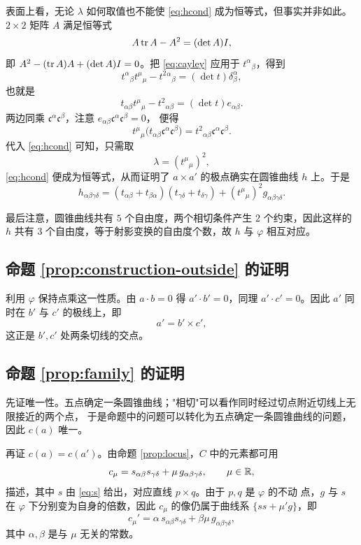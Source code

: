 表面上看，无论 $\lambda$ 如何取值也不能使 \eqref{eq:hcond} 成为恒等式，但事实并非如此。
$2\times2$ 矩阵 $A$ 满足恒等式
\begin{equation}\label{eq:cayley}
A\operatorname{tr} A-A^2=(\det A)I,
\end{equation}
即 $A^2-(\operatorname{tr} A)A+(\det A)I=0$。把 \eqref{eq:cayley} 应用于 ${t^\alpha}_\beta$，得到
\[
{t^\alpha}_\beta{t^\mu}_\mu-{{t^2}{}^\alpha}_\beta=(\det t)\delta^\alpha_\beta,
\]
也就是
\[
t_{\alpha\beta}{t^\mu}_\mu-{t^2}_{\alpha\beta}=(\det t)e_{\alpha\beta}.
\]
两边同乘 $\mathfrak c^\alpha\mathfrak c^\beta$，注意 $e_{\alpha\beta}\mathfrak c^\alpha\mathfrak c^\beta=0$，
便得
\[
{t^\mu}_\mu\bigl(t_{\alpha\beta}\mathfrak c^\alpha\mathfrak c^\beta\bigr)
={t^2}_{\alpha\beta}\mathfrak c^\alpha\mathfrak c^\beta .
\]
代入 \eqref{eq:hcond} 可知，只需取
\[
\lambda=({t^\mu}_\mu)^2,
\]
\eqref{eq:hcond} 便成为恒等式，从而证明了 $a\times a'$ 的极点确实在圆锥曲线 $h$ 上。于是
\begin{equation}\label{eq:hformula}
\boxed{\;h_{\alpha\beta\gamma\delta}
=(t_{\alpha\beta}+t_{\beta\alpha})(t_{\gamma\delta}+t_{\delta\gamma})
+({t^\mu}_\mu)^2g_{\alpha\beta\gamma\delta}.\;}
\end{equation}

最后注意，圆锥曲线共有 $5$ 个自由度，两个相切条件产生 $2$ 个约束，因此这样的 $h$ 共有
$3$ 个自由度，等于射影变换的自由度个数，故 $h$ 与 $\varphi$ 相互对应。

\subsection{命题 \ref{prop:construction-outside} 的证明}

利用 $\varphi$ 保持点乘这一性质。由 $a\cdot b=0$ 得 $a'\cdot b'=0$，同理
$a'\cdot c'=0$。因此 $a'$ 同时在 $b'$ 与 $c'$ 的极线上，即
\[
a'=b'\times c',
\]
这正是 $b',c'$ 处两条切线的交点。

\subsection{命题 \ref{prop:family} 的证明}

先证唯一性。五点确定一条圆锥曲线；"相切"可以看作同时经过切点附近切线上无限接近的两个点，
于是命题中的问题可以转化为五点确定一条圆锥曲线的问题，因此 $c(a)$ 唯一。

再证 $c(a)=c(a')$。由命题 \ref{prop:locus}，$C$ 中的元素都可用
\begin{equation}\label{eq:family}
c_\mu=s_{\alpha\beta}s_{\gamma\delta}+\mu\,g_{\alpha\beta\gamma\delta},
\qquad \mu\in\mathbb{R},
\end{equation}
描述，其中 $s$ 由 \eqref{eq:s} 给出，对应直线 $p\times q$。由于 $p,q$ 是 $\varphi$ 的不动
点，$g$ 与 $s$ 在 $\varphi$ 下分别变为自身的倍数，因此 $c_\mu$ 的像仍属于曲线系
$\{ss+\mu'g\}$，即
\[
c_\mu'=\alpha\,s_{\alpha\beta}s_{\gamma\delta}
+\beta\mu\,g_{\alpha\beta\gamma\delta},
\]
其中 $\alpha,\beta$ 是与 $\mu$ 无关的常数。

